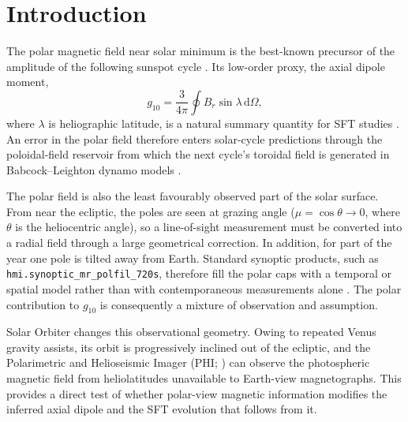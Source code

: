 \documentclass{aa}
\begin{document}


\maketitle

\section{Introduction}
\label{sec:introduction}

The polar magnetic field near solar minimum is the best-known precursor of the amplitude of the following sunspot cycle \citep{Svalgaard2005,Petrovay2020}. Its low-order proxy, the axial dipole moment,
\begin{equation}
    g_{10} = \frac{3}{4\pi} \oint B_r \sin\lambda\,\mathrm{d}\Omega,
    \label{eq:g10-intro}
\end{equation}
where $\lambda$ is heliographic latitude, is a natural summary quantity for SFT studies \citep{Babcock1961,Leighton1969,Sheeley2005,WangSheeley1991,Wang2017}. An error in the polar field therefore enters solar-cycle predictions through the poloidal-field reservoir from which the next cycle's toroidal field is generated in Babcock--Leighton dynamo models \citep{CameronSchussler2015}.

The polar field is also the least favourably observed part of the solar surface. From near the ecliptic, the poles are seen at grazing angle ($\mu=\cos\theta\to0$, where $\theta$ is the heliocentric angle), so a line-of-sight measurement must be converted into a radial field through a large geometrical correction. In addition, for part of the year one pole is tilted away from Earth. Standard synoptic products, such as \texttt{hmi.synoptic\_mr\_polfil\_720s}, therefore fill the polar caps with a temporal or spatial model rather than with contemporaneous measurements alone \citep{Sun2018}. The polar contribution to $g_{10}$ is consequently a mixture of observation and assumption.

Solar Orbiter \citep{Muller2020} changes this observational geometry. Owing to repeated Venus gravity assists, its orbit is progressively inclined out of the ecliptic, and the Polarimetric and Helioseismic Imager (PHI; \citealp{Solanki2020}) can observe the photospheric magnetic field from heliolatitudes unavailable to Earth-view magnetographs. This provides a direct test of whether polar-view magnetic information modifies the inferred axial dipole and the SFT evolution that follows from it.
\end{document}
